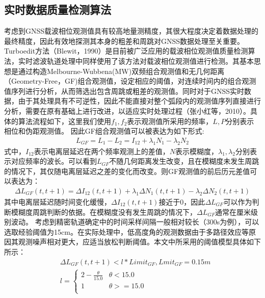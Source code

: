 \subsection{实时数据质量检测算法}
考虑到GNSS载波相位观测值具有较高地量测精度，其很大程度决定着数据处理的最终精度，因此有效地探测其本身的粗差和周跳对GNSS数据处理至关重要。
Turboedit方法（Blewit，1990）是目前被广泛应用的载波相位观测值质量检测算法，实时滤波轨道处理中同样使用了该方法对载波相位观测值进行检测。其基本思想是通过构造Melbourne-Wubbena(MW)双频组合观测值和无几何距离（Geometry-Free，GF)组合观测值，设定相应的阈值，对连续时间内的组合观测值序列进行分析，从而筛选出包含周跳或粗差的观测值。同时对于GNSS实时数据，由于其处理具有不可逆性，因此不能直接对整个弧段内的观测值序列直接进行分析，需要在原有基础上进行改进，以适应实时处理过程（张小红等，2010）。具体的算法流程如下，这里我们使用\(f_{1},f_{2}\)表示观测值所采用的频率，\(L,P\)分别表示相位和伪距观测值。
因此GF组合观测值可以被表达为如下形式:
\begin{equation}
	\begin{aligned}
		L_{GF}=L_{1}-L_{2}=I_{12}+\lambda_{1}N_{1}-\lambda_{2}N_{2}	
	\end{aligned}
	\label{eq:GF_eq}
\end{equation}
式中，\(I_{12}\)表示电离层延迟在两个频率观测上的差值，\(N\)表示模糊度，\(\lambda_{1},\lambda_{2}\)分别表示对应频率的波长。可以看到\(L_{GF}\)不随几何距离发生改变，且在模糊度未发生周跳的情况下，其仅随电离层延迟之差的变化而改变。则GF观测值的前后历元差值可以表达为：
\begin{equation}
	\begin{aligned}
	\Delta L_{GF}(t,t+1) = \Delta I_{12}(t,t+1) + \lambda_{1}\Delta N_{1}(t,t+1) - \lambda_{2}\Delta N_{2}(t,t+1)
	\end{aligned}
	\label{eq:GF_delta}
\end{equation}
其中电离层延迟随时间变化缓慢，\(\Delta I_{12}(t,t+1)\)接近于0，因此\(\Delta L_{GF}\)可以作为判断模糊度周跳判断的依据。在模糊度没有发生周跳的情况下，\(\Delta L_{GF}\)通常在厘米级别波动。
考虑到精密轨道确定中的时间采样间隔一般相对较长（300s为例），可以选取经验阈值为15cm。在实际处理中，低高度角的观测数据由于多路径效应等原因其观测噪声相对更大，应适当放松判断阈值。本文中所采用的阈值模型具体如下所示：
\begin{equation}
	\begin{aligned}
		& \Delta L_{GF}(t,t+1) < l * Limit_{GF},Lmit_{GF}=0.15m\\
		& l=
		\begin{cases}
			  2- \frac{\theta}{15.0} & \theta < 15.0 \\
			  1 & \theta >=15.0 \\
		\end{cases}
	\end{aligned}
\end{equation}
